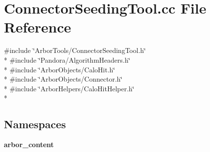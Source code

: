 \section{Connector\+Seeding\+Tool.\+cc File Reference}
\label{ConnectorSeedingTool_8cc}
{\ttfamily \#include \char`\"{}Arbor\+Tools/\+Connector\+Seeding\+Tool.\+h\char`\"{}}\\*
{\ttfamily \#include \char`\"{}Pandora/\+Algorithm\+Headers.\+h\char`\"{}}\\*
{\ttfamily \#include \char`\"{}Arbor\+Objects/\+Calo\+Hit.\+h\char`\"{}}\\*
{\ttfamily \#include \char`\"{}Arbor\+Objects/\+Connector.\+h\char`\"{}}\\*
{\ttfamily \#include \char`\"{}Arbor\+Helpers/\+Calo\+Hit\+Helper.\+h\char`\"{}}\\*
\subsection*{Namespaces}
\begin{DoxyCompactItemize}
\item 
 {\bf arbor\+\_\+content}
\end{DoxyCompactItemize}
